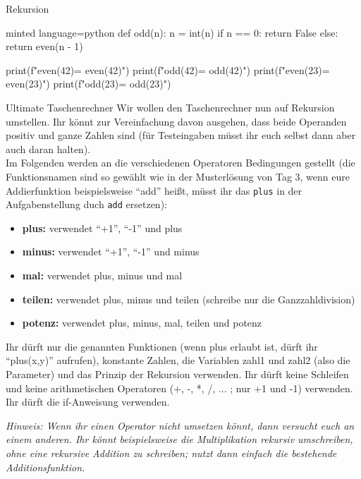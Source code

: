 \begin{task}[points=auto]{Rekursion}
\begin{subtask*}[points=0]{}
\begin{solution}
\begin{codeBlock}[]{minted language=python}
                def odd(n):
                    n = int(n)
                    if n == 0:
                        return False
                    else:
                        return even(n - 1)


                print(f"even(42)= {even(42)}")
                print(f"odd(42)= {odd(42)}")
                print(f"even(23)= {even(23)}")
                print(f"odd(23)= {odd(23)}")
            \end{codeBlock}
        \end{solution}
    \end{subtask*}
    \begin{subtask*}[points=0]{Ultimate Taschenrechner }
        Wir wollen den Taschenrechner nun auf Rekursion umstellen. Ihr könnt zur Vereinfachung
        davon ausgehen, dass beide Operanden positiv und ganze Zahlen sind (für Testeingaben
        müsst ihr euch selbst dann aber auch daran halten).\\
        Im Folgenden werden an die verschiedenen Operatoren Bedingungen gestellt (die
        Funktionsnamen sind so gewählt wie in der Musterlösung von Tag 3, wenn eure
        Addierfunktion beispielsweise "`add"' heißt, müsst ihr das \texttt{plus} in der Aufgabenstellung duch \texttt{add} ersetzen):
        \begin{itemize}
            \item \textbf{\textcolor[rgb]{0,0.5,1}{plus:}} verwendet "`+1"', "`-1"' und plus
            \item \textbf{\textcolor[rgb]{0,0.5,1}{minus:}} verwendet "`+1"', "`-1"' und minus
            \item \textbf{\textcolor[rgb]{0,0.5,1}{mal:}} verwendet plus, minus und mal
            \item \textbf{\textcolor[rgb]{0,0.5,1}{teilen:}} verwendet plus, minus und teilen (schreibe nur die Ganzzahldivision)
            \item \textbf{\textcolor[rgb]{0,0.5,1}{potenz:}} verwendet plus, minus, mal, teilen und potenz
        \end{itemize}
        Ihr dürft nur die genannten Funktionen (wenn plus erlaubt ist, dürft ihr "`plus(x,y)"' aufrufen),
        konstante Zahlen, die Variablen zahl1 und zahl2 (also die Parameter) und das Prinzip
        der Rekursion verwenden. Ihr dürft keine Schleifen und keine arithmetischen Operatoren
        (+, -, *, /, ... ; nur +1 und -1) verwenden. Ihr dürft die if-Anweisung verwenden.

        \textit{Hinweis: Wenn ihr einen Operator nicht umsetzen könnt, dann versucht euch an einem anderen.
            Ihr könnt beispielsweise die Multiplikation rekursiv umschreiben, ohne eine rekursive
            Addition zu schreiben; nutzt dann einfach die bestehende Additionsfunktion.}


\end{subtask*}
\end{task}
